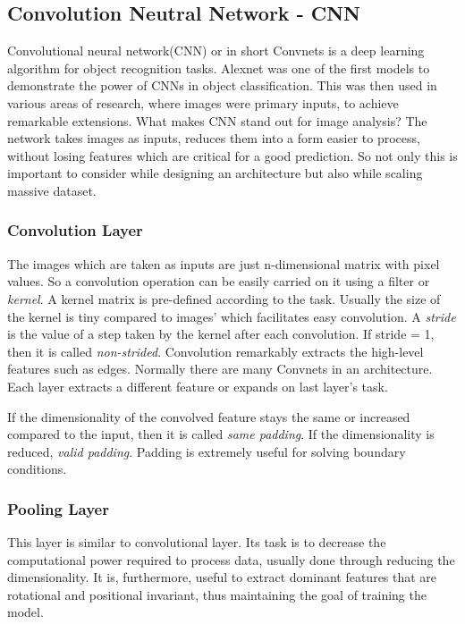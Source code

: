 \subsection{Convolution Neutral Network - CNN}
Convolutional neural network(CNN) or in short Convnets is a deep learning algorithm for object recognition
tasks. Alexnet \cite{Alexnet2012} was one of the first models to demonstrate the power of
CNNs in object classification. This was then used in various areas of research, where
images were primary inputs, to achieve remarkable extensions. What makes CNN stand out for image
analysis? The network takes images as inputs, reduces them into a form
easier to process, without losing features which are critical for a good prediction. So
not only this is important to consider while designing an architecture but also while
scaling massive dataset.
\subsubsection*{Convolution Layer}
\label{subsubsec:convlayer}
The images which are taken as inputs are just n-dimensional matrix with pixel values. So a
convolution operation can be easily carried on it using a filter or \textit{kernel}. A
kernel matrix is pre-defined according to the task. Usually the size of the kernel is tiny compared to images' which facilitates easy
convolution. A \textit{stride} is the value of a step taken by the kernel after each
convolution. If stride = 1, then it is called \textit{non-strided}. Convolution remarkably
extracts the high-level features such as edges. Normally there are many Convnets in an
architecture. Each layer extracts a different feature or expands on last layer's task.

If the dimensionality of the convolved feature stays the same or increased compared to the
input, then it is called \textit{same padding}. If the dimensionality is reduced,
\textit{valid padding}. Padding is extremely useful for solving boundary conditions.

\subsubsection*{Pooling Layer}
\label{subsubsec:pooling}
This layer is similar to convolutional layer. Its task is to decrease the computational
power required to process data, usually done through reducing the dimensionality. It is,
furthermore, useful to extract dominant features that are rotational and positional
invariant, thus maintaining the goal of training the model.

